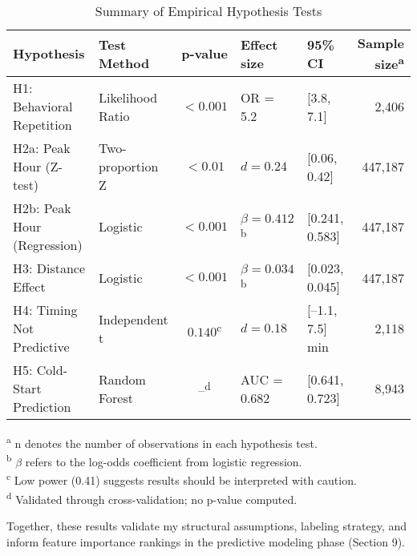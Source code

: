 \begin{table}[H]
\centering
\caption{Summary of Empirical Hypothesis Tests}
\label{tab:hypothesis_summary}
\begin{tabular}{@{}p{3.8cm}p{2.5cm}cp{2.8cm}p{2.5cm}r@{}}
\toprule
\textbf{Hypothesis} & \textbf{Test Method} & \textbf{p-value} & \textbf{Effect size} & \textbf{95\% CI} & \textbf{Sample size}\textsuperscript{a} \\
\midrule
H1: Behavioral Repetition & Likelihood Ratio & $< 0.001$ & OR = 5.2 & [3.8, 7.1] & 2,406 \\
H2a: Peak Hour (Z-test) & Two-proportion Z & $< 0.01$ & $d = 0.24$ & [0.06, 0.42] & 447,187 \\
H2b: Peak Hour (Regression) & Logistic & $< 0.001$ & $\beta = 0.412$\textsuperscript{b} & [0.241, 0.583] & 447,187 \\
H3: Distance Effect & Logistic & $< 0.001$ & $\beta = 0.034$\textsuperscript{b} & [0.023, 0.045] & 447,187 \\
H4: Timing Not Predictive & Independent t & $0.140$\textsuperscript{c} & $d = 0.18$ & [--1.1, 7.5] min & 2,118 \\
H5: Cold-Start Prediction & Random Forest & --\textsuperscript{d} & AUC = 0.682 & [0.641, 0.723] & 8,943 \\
\bottomrule
\end{tabular}
\smallskip
\footnotesize{\textsuperscript{a} n denotes the number of observations in each hypothesis test.\\
\textsuperscript{b} $\beta$ refers to the log-odds coefficient from logistic regression.\\
\textsuperscript{c} Low power (0.41) suggests results should be interpreted with caution.\\
\textsuperscript{d} Validated through cross-validation; no p-value computed.}
\end{table}

Together, these results validate my structural assumptions, labeling strategy, and inform feature importance rankings in the predictive modeling phase (Section 9).